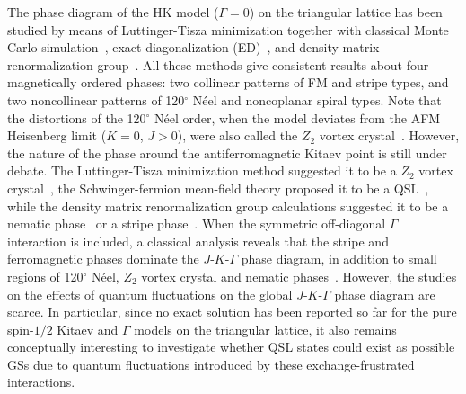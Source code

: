 \documentclass[aps,prb,reprint,amsfonts,amsmath,amssymb,showpacs,groupedaddress,superscriptaddress]{revtex4-1}
\begin{document}
The phase diagram of the HK model ($\Gamma=0$) on the triangular lattice has been studied by means of Luttinger-Tisza minimization together with classical Monte Carlo simulation~\cite{PhysRevB.93.104417}, exact diagonalization (ED)~\cite{PhysRevB.91.155135,KaiLi2015}, and density matrix renormalization group~\cite{JPSJ.85.114710,PhysRevX.9.021017}. All these methods give consistent results about four magnetically ordered phases: two collinear patterns of FM and stripe types, and two noncollinear patterns of 120$^\circ$ N\'{e}el and noncoplanar spiral types. Note that the distortions of the 120$^\circ$ N\'{e}el order, when the model deviates from the AFM Heisenberg limit ($K=0$, $J>0$), were also called the $Z_{2}$ vortex crystal~\cite{PhysRevB.93.104417,PhysRevB.91.155135,JPSJ.85.114710}. However, the nature of the phase around the antiferromagnetic Kitaev point is still under debate. The Luttinger-Tisza minimization method suggested it to be a $Z_{2}$ vortex crystal~\cite{PhysRevB.93.104417}, the Schwinger-fermion mean-field theory proposed it to be a QSL~\cite{KaiLi2015}, while the density matrix renormalization group calculations suggested it to be a nematic phase~\cite{PhysRevB.91.155135,JPSJ.85.114710} or a stripe phase~\cite{PhysRevX.9.021017}. When the symmetric off-diagonal $\Gamma$ interaction is included, a classical analysis reveals that the stripe and ferromagnetic phases dominate the $J$-$K$-$\Gamma$ phase diagram, in addition to small regions of 120$^\circ$ N\'{e}el, $Z_{2}$ vortex crystal and nematic phases~\cite{PhysRevB.92.165108}. However, the studies on the effects of quantum fluctuations on the global $J$-$K$-$\Gamma$ phase diagram are scarce. In particular, since no exact solution has been reported so far for the pure spin-$1/2$ Kitaev and $\Gamma$ models on the triangular lattice, it also remains conceptually interesting to investigate whether QSL states could exist as possible GSs due to quantum fluctuations introduced by these exchange-frustrated interactions.
\end{document}
